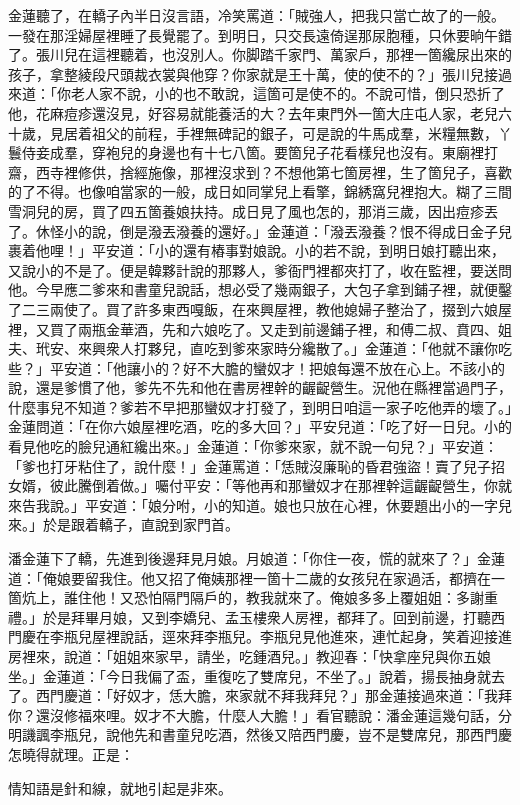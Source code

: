 金蓮聽了，在轎子內半日沒言語，冷笑罵道：「賊強人，把我只當亡故了的一般。一發在那淫婦屋裡睡了長覺罷了。到明日，只交長遠倚逞那尿胞種，只休要晌午錯了。張川兒在這裡聽着，也沒別人。你脚踏千家門、萬家戶，那裡一箇纔尿出來的孩子，拿整綾段尺頭裁衣裳與他穿？你家就是王十萬，使的使不的？」張川兒接過來道：「你老人家不說，小的也不敢說，這箇可是使不的。不說可惜，倒只恐折了他，{}花麻痘疹還沒見，好容易就能養活的大？去年東門外一箇大庄屯人家，老兒六十歲，見居着祖父的前程，手裡無碑記的銀子，可是說的牛馬成羣，米糧無數，丫鬟侍妾成羣，穿袍兒的身邊也有十七八箇。要箇兒子花看樣兒也沒有。東廟裡打齋，西寺裡修供，捨經施像，那裡沒求到？不想他第七箇房裡，生了箇兒子，喜歡的了不得。也像咱當家的一般，成日如同掌兒上看擎，錦綉窩兒裡抱大。糊了三間雪洞兒的房，買了四五箇養娘扶持。成日見了風也怎的，那消三歲，因出痘疹丟了。休怪小的說，倒是潑丟潑養的還好。」金蓮道：「潑丟潑養？恨不得成日金子兒裹着他哩！」平安道：「小的還有樁事對娘說。小的若不說，到明日娘打聽出來，又說小的不是了。便是韓夥計說的那夥人，爹衙門裡都夾打了，收在監裡，要送問他。今早應二爹來和書童兒說話，想必受了幾兩銀子，大包子拿到鋪子裡，就便鑿了二三兩使了。買了許多東西嘎飯，在來興屋裡，教他媳婦子整治了，掇到六娘屋裡，又買了兩瓶金華酒，先和六娘吃了。又走到前邊鋪子裡，和傅二叔、賁四、姐夫、玳安、來興衆人打夥兒，直吃到爹來家時分纔散了。」金蓮道：「他就不讓你吃些？」平安道：「他讓小的？好不大膽的蠻奴才！把娘每還不放在心上。不該小的說，還是爹慣了他，爹先不先和他在書房裡幹的齷齪營生。{}況他在縣裡當過門子，什麼事兒不知道？爹若不早把那蠻奴才打發了，到明日咱這一家子吃他弄的壞了。」金蓮問道：「在你六娘屋裡吃酒，吃的多大回？」平安兒道：「吃了好一日兒。小的看見他吃的臉兒通紅纔出來。」金蓮道：「你爹來家，就不說一句兒？」平安道：「爹也打牙粘住了，說什麼！」金蓮罵道：「恁賊沒廉恥的昏君強盜！賣了兒子招女婿，彼此騰倒着做。」{}囑付平安：「等他再和那蠻奴才在那裡幹這齷齪營生，你就來告我說。」平安道：「娘分咐，小的知道。娘也只放在心裡，休要題出小的一字兒來。」於是跟着轎子，直說到家門首。

潘金蓮下了轎，先進到後邊拜見月娘。月娘道：「你住一夜，慌的就來了？」金蓮道：「俺娘要留我住。他又招了俺姨那裡一箇十二歲的女孩兒在家過活，都擠在一箇炕上，誰住他！又恐怕隔門隔戶的，教我就來了。俺娘多多上覆姐姐：多謝重禮。」於是拜畢月娘，又到李嬌兒、孟玉樓衆人房裡，都拜了。回到前邊，打聽西門慶在李瓶兒屋裡說話，逕來拜李瓶兒。李瓶兒見他進來，連忙起身，笑着迎接進房裡來，說道：「姐姐來家早，請坐，吃鍾酒兒。」教迎春：「快拿座兒與你五娘坐。」金蓮道：「今日我偏了盃，重復吃了雙席兒，不坐了。」說着，揚長抽身就去了。西門慶道：「好奴才，恁大膽，來家就不拜我拜兒？」那金蓮接過來道：「我拜你？還沒修福來哩。奴才不大膽，什麼人大膽！」看官聽說：潘金蓮這幾句話，分明譏諷李瓶兒，說他先和書童兒吃酒，然後又陪西門慶，豈不是雙席兒，那西門慶怎曉得就理。正是：

\begin{myquote} 
情知語是針和線，就地引起是非來。
\end{myquote} 

